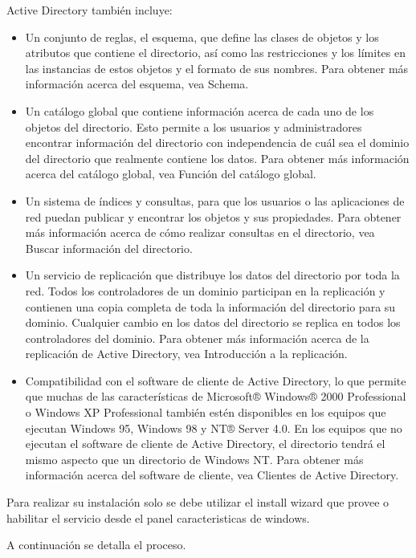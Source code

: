 \documentclass[paper=a4, fontsize=12pt]{article} 		%
\numberwithin{equation}{section}						%
\numberwithin{table}{section} 							%
\begin{document}
Active Directory también incluye:
\begin{itemize}
\item Un conjunto de reglas, el esquema, que define las clases de objetos y los atributos que contiene el directorio, así como las restricciones y los límites en las instancias de estos objetos y el formato de sus nombres. Para obtener más información acerca del esquema, vea Schema.
\item Un catálogo global que contiene información acerca de cada uno de los objetos del directorio. Esto permite a los usuarios y administradores encontrar información del directorio con independencia de cuál sea el dominio del directorio que realmente contiene los datos. Para obtener más información acerca del catálogo global, vea Función del catálogo global.
\item Un sistema de índices y consultas, para que los usuarios o las aplicaciones de red puedan publicar y encontrar los objetos y sus propiedades. Para obtener más información acerca de cómo realizar consultas en el directorio, vea Buscar información del directorio.
\item Un servicio de replicación que distribuye los datos del directorio por toda la red. Todos los controladores de un dominio participan en la replicación y contienen una copia completa de toda la información del directorio para su dominio. Cualquier cambio en los datos del directorio se replica en todos los controladores del dominio. Para obtener más información acerca de la replicación de Active Directory, vea Introducción a la replicación.
\item Compatibilidad con el software de cliente de Active Directory, lo que permite que muchas de las características de Microsoft® Windows® 2000 Professional o Windows XP Professional también estén disponibles en los equipos que ejecutan Windows 95, Windows 98 y NT® Server 4.0. En los equipos que no ejecutan el software de cliente de Active Directory, el directorio tendrá el mismo aspecto que un directorio de Windows NT. Para obtener más información acerca del software de cliente, vea Clientes de Active Directory.
\end{itemize}

Para realizar su instalación solo se debe utilizar el install wizard que provee o habilitar el servicio desde el panel caracteristicas de windows.

A continuación se detalla el proceso. 
\end{document}
